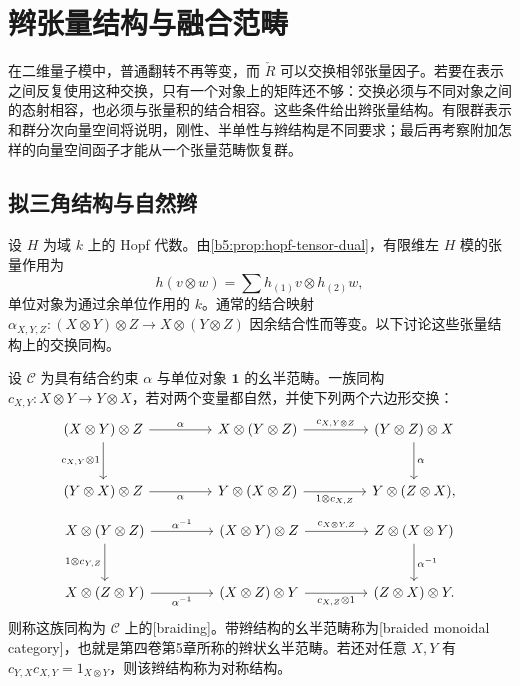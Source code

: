 
\section{辫张量结构与融合范畴}
\label{b5:sec:B05}

在二维量子模中，普通翻转不再等变，而 \(\check R\) 可以交换相邻张量因子。若要在表示之间反复使用这种交换，只有一个对象上的矩阵还不够：交换必须与不同对象之间的态射相容，也必须与张量积的结合相容。这些条件给出辫张量结构。有限群表示和群分次向量空间将说明，刚性、半单性与辫结构是不同要求；最后再考察附加怎样的向量空间函子才能从一个张量范畴恢复群。

\subsection{拟三角结构与自然辫}
\label{b5:subsec:B05:01}

设 \(H\) 为域 \(k\) 上的 Hopf 代数。由\cref{b5:prop:hopf-tensor-dual}，有限维左 \(H\) 模的张量作用为
\[
	h(v\otimes w)=\sum h_{(1)}v\otimes h_{(2)}w,
\]
单位对象为通过余单位作用的 \(k\)。通常的结合映射 \(\alpha_{X,Y,Z}:(X\otimes Y)\otimes Z\to X\otimes(Y\otimes Z)\) 因余结合性而等变。以下讨论这些张量结构上的交换同构。

\begin{definition}\label{b5:def:B-braiding}
	设 \(\mathcal C\) 为具有结合约束 \(\alpha\) 与单位对象 \(\mathbf1\) 的幺半范畴。一族同构 \(c_{X,Y}:X\otimes Y\to Y\otimes X\)，若对两个变量都自然，并使下列两个六边形交换：
	\[
		\begin{tikzcd}[column sep=4.5em,row sep=large]
			(X\otimes Y)\otimes Z\arrow[r,"\alpha"]\arrow[d,"c_{X,Y}\otimes1"']
			&X\otimes(Y\otimes Z)\arrow[r,"c_{X,Y\otimes Z}"]
			&(Y\otimes Z)\otimes X\arrow[d,"\alpha"]\\
			(Y\otimes X)\otimes Z\arrow[r,"\alpha"']
			&Y\otimes(X\otimes Z)\arrow[r,"1\otimes c_{X,Z}"']
			&Y\otimes(Z\otimes X),
		\end{tikzcd}
	\]
	\[
		\begin{tikzcd}[column sep=4.5em,row sep=large]
			X\otimes(Y\otimes Z)\arrow[r,"\alpha^{-1}"]\arrow[d,"1\otimes c_{Y,Z}"']
			&(X\otimes Y)\otimes Z\arrow[r,"c_{X\otimes Y,Z}"]
			&Z\otimes(X\otimes Y)\arrow[d,"\alpha^{-1}"]\\
			X\otimes(Z\otimes Y)\arrow[r,"\alpha^{-1}"']
			&(X\otimes Z)\otimes Y\arrow[r,"c_{X,Z}\otimes1"']
			&(Z\otimes X)\otimes Y.
		\end{tikzcd}
	\]
	则称这族同构为 \(\mathcal C\) 上的[braiding]。带辫结构的幺半范畴称为[braided monoidal category]，也就是第四卷第5章所称的辫状幺半范畴。若还对任意 \(X,Y\) 有 \(c_{Y,X}c_{X,Y}=1_{X\otimes Y}\)，则该辫结构称为对称结构。
\end{definition}

